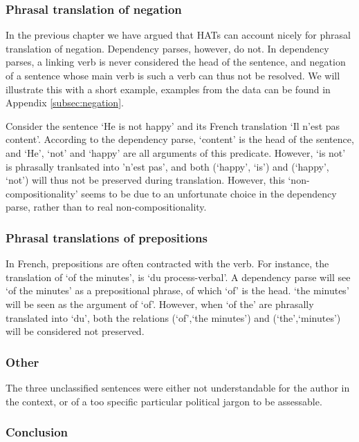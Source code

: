 \subsubsection{Phrasal translation of negation}

In the previous chapter we have argued that HATs can account nicely for phrasal translation of negation. Dependency parses, however, do not. In dependency parses, a linking verb is never considered the head of the sentence, and negation of a sentence whose main verb is such a verb can thus not be resolved. We will illustrate this with a short example, examples from the data can be found in Appendix \ref{subsec:negation}. 

Consider the sentence `He is not happy' and its French translation `Il n'est pas content'. According to the dependency parse,  `content' is the head of the sentence, and `He', `not' and `happy' are all arguments of this predicate. However, `is not' is phrasally tranlsated into 'n'est pas', and both (`happy', `is') and (`happy', `not') will thus not be preserved during translation. However, this `non-compositionality' seems to be due to an unfortunate choice in the dependency parse, rather than to real non-compositionality.

\subsubsection{Phrasal translations of prepositions}

In French, prepositions are often contracted with the verb. For instance, the translation of `of the minutes', is `du process-verbal'. A dependency parse will see `of the minutes' as a prepositional phrase, of which `of' is the head. `the minutes' will be seen as the argument of `of'. However, when `of the' are phrasally translated into `du', both the relations (`of',`the minutes') and (`the',`minutes') will be considered not preserved.

\subsubsection{Other}

The three unclassified sentences were either not understandable for the author in the context, or of a too specific particular political jargon to be assessable.


\subsubsection{Conclusion}

